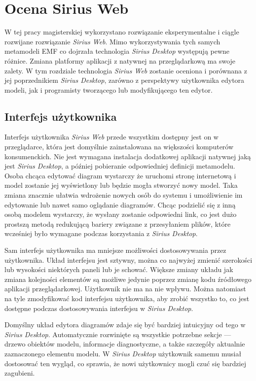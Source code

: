 \chapter{Ocena Sirius Web}

W tej pracy magisterskiej wykorzystano rozwiązanie eksperymentalne i ciągle
rozwijane rozwiązanie \emph{Sirius Web}.
Mimo wykorzystywania tych samych metamodeli \gls{EMF} co dojrzała technologia
\emph{Sirius Desktop} występują pewne różnice. Zmiana platformy aplikacji z
natywnej na przeglądarkową ma swoje zalety. W tym rozdziale technologia
\emph{Sirius Web} zostanie oceniona i porównana z jej poprzednikiem
\emph{Sirius Desktop}, zarówno z perspektywy użytkownika edytora modeli, jak i
programisty tworzącego lub modyfikującego ten edytor.

\section{Interfejs użytkownika}

Interfejs użytkownika \emph{Sirius Web} przede wszystkim dostępny jest on w
przeglądarce, która jest domyślnie zainstalowana
na większości komputerów konsumenckich. Nie jest wymagana instalacja dodatkowej
aplikacji natywnej jaką jest \emph{Sirius Desktop}, a później pobieranie
odpowiedniej definicji metamodelu. Osoba chcąca edytować diagram wystarczy że
uruchomi stronę internetową i model zostanie jej wyświetlony lub będzie mogła
stworzyć nowy model. Taka zmiana
znacznie ułatwia wdrożenie nowych osób do systemu i umożliwienie im edytowanie
lub nawet samo oglądanie diagramów. Chcąc podzielić się z inną osobą modelem
wystarczy, że wysłany zostanie odpowiedni link, co jest dużo prostszą metodą
redukującą bariery związane z przesyłaniem plików, które wcześniej było
wymagane podczas korzystania z \emph{Sirius Desktop}.

Sam interfejs użytkownika ma mniejsze możliwości dostosowywania przez
użytkownika. Układ
interfejsu jest sztywny, można co najwyżej zmienić szerokości lub wysokości
niektórych paneli lub je schować. Większe zmiany układu jak zmiana kolejności
elementów są możliwe jedynie poprzez zmianę kodu źródłowego aplikacji
przeglądarkowej. Użytkownik nie ma na nie wpływu. Można natomiast na tyle
zmodyfikować kod interfejsu użytkownika, aby zrobić wszystko to, co jest
dostępne podczas dostosowywania interfejsu w \emph{Sirius Desktop}.

Domyślny układ edytora diagramów zdaje się być bardziej intuicyjny od tego w
\emph{Sirius Desktop}. Automatycznie rozwinięte są wszystkie potrzebne sekcje
--- drzewo obiektów modelu, informacje diagnostyczne, a także szczegóły
aktualnie zaznaczonego elementu modelu. W \emph{Sirius Desktop} użytkownik
samemu musiał dostosować ten wygląd, co sprawia, że nowi użytkownicy mogli czuć
się bardziej zagubieni.

